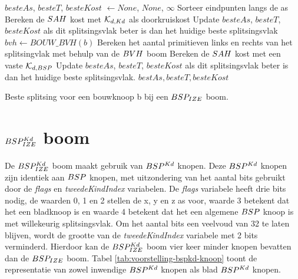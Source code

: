 \begin{dutchalgorithm}
    \begin{algorithmic}       
            \State $besteAs$, $besteT$, $besteKost$ $\gets None$, $None$, $\infty$
                \State Sorteer eindpunten langs de as
                    \State Bereken de $SAH$ kost met $\mathcal{K}_{d,Kd}$ als doorkruiskost
                    \State Update $besteAs$, $besteT$, $besteKost$ als dit splitsingsvlak beter is dan het huidige beste splitsingsvlak
                \EndFor        
            \EndFor
            \State $bvh \gets BOUW\_BVH(b)$
                    \State Bereken het aantal primitieven links en rechts van het splitsingvlak met behulp van de $BVH$ boom
                    \State Bereken de $SAH$ kost met een vaste $\mathcal{K}_{d,BSP}$ 
                    \State Update $besteAs$, $besteT$, $besteKost$ als dit splitsingsvlak beter is dan het huidige beste splitsingsvlak.
                \EndFor       
            \EndFor
            \State \Return $bestAs, besteT, besteKost$
        \EndFunction
    \end{algorithmic}
    \caption{Beste splitsing voor een bouwknoop b bij een $BSP_{IZE}$ boom.}
    \label{alg:bspize-beste-split}
\end{dutchalgorithm}


\section{$BSP^{Kd}_{IZE}$ boom}
\label{sec:h4-bspizefastkd}
De $BSP^{Kd}_{IZE}$ boom maakt gebruik van $BSP^{Kd}$ knopen. 
Deze $BSP^{Kd}$ knopen zijn identiek aan $BSP$ knopen, met uitzondering van het aantal bits gebruikt door de \textit{flags} en \textit{tweedeKindIndex} variabelen. 
De \textit{flags} variabele heeft drie bits nodig, de waarden 0, 1 en 2 stellen de x, y en z as voor, waarde 3 betekent dat het een bladknoop is en waarde 4 betekent dat het een algemene $BSP$ knoop is met willekeurig splitsingsvlak.
Om het aantal bits een veelvoud van 32 te laten blijven, wordt de grootte van de \textit{tweedeKindIndex} variabele met 2 bits verminderd.
Hierdoor kan de $BSP^{Kd}_{IZE}$ boom vier keer minder knopen bevatten dan de $BSP_{IZE}$ boom.
Tabel \ref{tab:voorstelling-bspkd-knoop} toont de representatie van zowel inwendige $BSP^{Kd}$ knopen als blad $BSP^{Kd}$ knopen.\\

